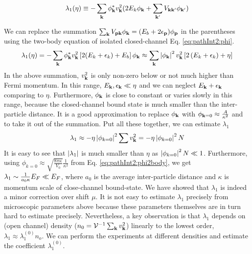 \begin{equation*}
\lambda_{1}(\eta)\equiv-\sum_{\mathbf{k}}{\phi_{\mathbf{k}}^{*}}v_{\mathbf{k}}^{2}(2E_{k}\phi_{\mathbf{k}}+\sum_{\mathbf{k}'}V_{\mathbf{k}\mathbf{k}'}\phi_{\mathbf{k}'})
\end{equation*}

We can replace the summation $\sum_{\mathbf{k}}V_{\mathbf{p}\mathbf{k}} \phi_{\mathbf{k}}=(E_{b}+2\epsilon_{\mathbf{p}})\phi_{\mathbf{p}}$ in the parentheses using the two-body \sch equation of isolated closed-channel Eq. \ref{eq:pathInt2:phi}.
\begin{equation*}
\lambda_{1}(\eta)=-\sum_{\mathbf{k}}{\phi_{\mathbf{k}}^{*}}v_{\mathbf{k}}^{2}\left[2(E_{k}+\epsilon_{k})+E_b\right]\phi_{\mathbf{k}}
	\approx\sum_{\mathbf{k}}\left\lvert{\phi_{\ensuremath{\mathbf{k}}}}\right\rvert^2v_{\mathbf{k}}^{2}\left[2\left(E_{k}+\epsilon_{k}\right)+\eta\right]
\end{equation*}
In the above summation, $v_{\mathbf{k}}^2$ is only non-zero below or not much higher than Fermi momentum.  In this range, $E_{\mathbf{k}},\epsilon_{\mathbf{k}}\ll\eta$ and we can neglect $E_{\mathbf{k}}+\epsilon_{\mathbf{k}}$ comparing to $\eta$.  
Furthermore, $\phi_{\mathbf{k}}$ is close to constant or varies slowly in this range, because the closed-channel bound state is much smaller than the inter-particle distance.    It is a good approximation to replace $\phi_{\mathbf{k}}$ with $\phi_{\mathbf{k}=0}\approx\frac{A}{\kappa^{2}}$ and to take it out of the summation.  
Put all these together, we can estimate $\lambda_{1}$ 
\begin{equation}
\lambda_{1}\approx-\eta\left\lvert{\phi_{k=0}}\right\rvert^2\sum{}v_{\mathbf{k}}^{2}=-\eta\left\lvert{\phi_{k=0}}\right\rvert^2N	
\end{equation}
It is easy to see that $\left\lvert{\lambda_{1}}\right\rvert$ is much smaller than $\eta$ as $\left\lvert{\phi_{k=0}}\right\rvert^2N\ll1$.  Furthermore, using $\phi_{k=0}\approx\sqrt{\frac{8\pi\kappa}{V_{0}}}\frac{1}{\kappa^{2}}$ from Eq. \ref{eq:pathInt2:phi2body}, we get $\lambda_{1}\sim\frac{1}{a_{0}\kappa}E_{F}\ll{}E_{F}$, where $a_{0}$ is the average inter-particle distance and $\kappa$ is momentum scale of close-channel bound-state.   We have showed that $\lambda_{1}$ is indeed a minor correction over shift $\mu$.
It is not easy to estimate $\lambda_{1}$ precisely from  microscopic parameters above because these parameters themselves are  in turn hard to  estimate precisely.  Nevertheless, a key observation is that $\lambda_1$ depends on (open channel) density ($n_{0}={\mathcal{V}^{-1}}\sum_{\mathbf{k}}v_{\mathbf{k}}^2$) linearly to the lowest order, $\lambda_1\approx\lambda_1^{(0)}n_{o}$.  We can perform the experiments at different densities and estimate the coefficient $\lambda_1^{(0)}$. 


